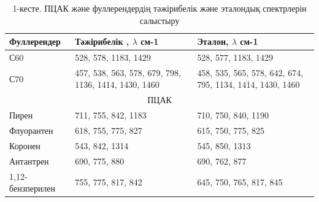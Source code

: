 \begin{table}[H]
\caption*{1-кесте. ПЦАК және фуллерендердің тәжірибелік және эталондық спектрлерін салыстыру}
\centering
\begin{tabular}{|lll|}
\hline
\multicolumn{1}{|l|}{Фуллерендер} & \multicolumn{1}{l|}{Тәжірибелік , $\lambda$ см-1} & Эталон, $\lambda$ см-1 \\ \hline
\multicolumn{1}{|l|}{С60} & \multicolumn{1}{l|}{528, 578, 1183, 1429} & 528, 577,  1183, 1429 \\ \hline
\multicolumn{1}{|l|}{С70} & \multicolumn{1}{p{0.3\textwidth}|}{457, 538, 563, 578, 679, 798, 1136, 1414, 1430, 1460} & \multicolumn{1}{p{0.3\textwidth}|}{458, 535, 565, 578, 642, 674, 795, 1134, 1414, 1430, 1460} \\ \hline
\multicolumn{3}{|c|}{ПЦАК} \\ \hline
\multicolumn{1}{|l|}{Пирен} & \multicolumn{1}{l|}{711, 755, 842, 1183} & 710, 750, 840, 1190 \\ \hline
\multicolumn{1}{|l|}{Флуорантен} & \multicolumn{1}{l|}{618, 755, 775, 827} & 615, 750, 775, 825 \\ \hline
\multicolumn{1}{|l|}{Коронен} & \multicolumn{1}{l|}{543, 842, 1314} & 545, 850, 1313 \\ \hline
\multicolumn{1}{|l|}{Антантрен} & \multicolumn{1}{l|}{690, 775, 880} & 690, 762, 877 \\ \hline
\multicolumn{1}{|l|}{1,12-бензперилен} & \multicolumn{1}{l|}{755, 775, 817, 842} & 645, 750, 765, 817, 845 \\ \hline
\end{tabular}
\end{table}

